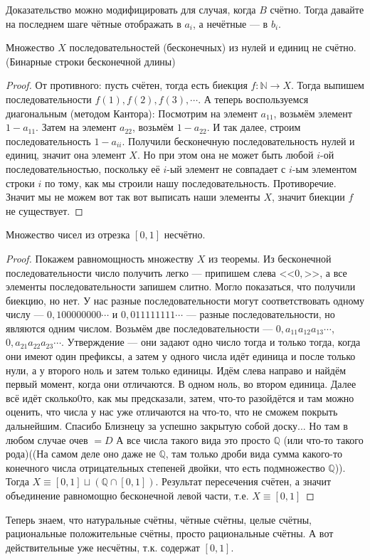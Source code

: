 \begin{remark}
Доказательство можно модифицировать для случая, когда $B$ счётно. Тогда давайте на последнем шаге чётные отображать в $a_i$, а нечётные --- в $b_i$. 
\end{remark}
\begin{theorem}
	Множество $X$ последовательностей (бесконечных) из нулей и единиц не счётно. (Бинарные строки бесконечной длины)
\end{theorem}
\begin{proof}
	От противного: пусть счётен, тогда есть биекция $f \colon \mathbb{N} \to X$. Тогда выпишем последовательности $f(1), f(2), f(3), \cdots$. 
	А теперь воспользуемся диагональным (методом Кантора): Посмотрим на элемент $a_{11}$, возьмём элемент $1 - a_{11}$. Затем на элемент $a_{22}$, возьмём $1 - a_{22}$. И так далее, строим последовательность $1 - a_{ii}$. Получили бесконечную последовательность нулей и единиц, значит она элемент $X$. Но при этом она не может быть любой $i$-ой последовательностью, поскольку её $i$-ый элемент не совпадает с $i$-ым элементом строки $i$ по тому, как мы строили нашу последовательность.
	Противоречие. Значит мы не можем вот так вот выписать наши элементы $X$, значит биекции $f$ не существует. 
\end{proof}
\begin{consequence}
	Множество чисел из отрезка $[0, 1]$ несчётно.
\end{consequence}
\begin{proof}
	Покажем равномощность множеству $X$ из теоремы. Из бесконечной последовательности число получить легко --- припишем слева <<$0,$>>, а все элементы последовательности запишем слитно. Могло показаться, что получили биекцию, но нет. У нас разные последовательности могут соответствовать одному числу --- $0,100000000\cdots$ и $0,011111111\cdots$  --- разные последовательности, но являются одним числом. 
	Возьмём две последовательности --- $0,a_{11}a_{12}a_{13}\cdots$, $0,a_{21}a_{22}a_{23}\cdots$. Утверждение --- они задают одно число тогда и только тогда, когда они имеют один префиксы, а затем у одного числа идёт единица и после только нули, а у второго ноль и затем только единицы.
	Идём слева направо и найдём первый момент, когда они отличаются. В одном ноль, во втором единица. Далее всё идёт сколько0то, как мы предсказали, затем, что-то разойдётся и там можно оценить, что числа у нас уже отличаются на что-то, что не сможем покрыть дальнейшим. Спасибо Близнецу за успешно закрытую собой доску... Но там в любом случае очев $=D$
	А все числа такого вида это просто $\mathbb{Q}$ (или что-то такого рода)((На самом деле оно даже не $\mathbb{Q}$, там только дроби вида сумма какого-то конечного числа отрицательных степеней двойки, что есть подмножество $\mathbb{Q}$)).
	Тогда $X \equiv [0, 1] \sqcup (\mathbb{Q} \cap [0, 1])$. Результат пересечения счётен, а значит объединение равномощно бесконечной левой части, т.е. $X \equiv [0, 1]$
\end{proof}
Теперь знаем, что натуральные счётны, чётные счётны, целые счётны, рациональные положительные счётны, просто рациональные счётны. А вот действительные уже несчётны, т.к. содержат $[0, 1]$.

